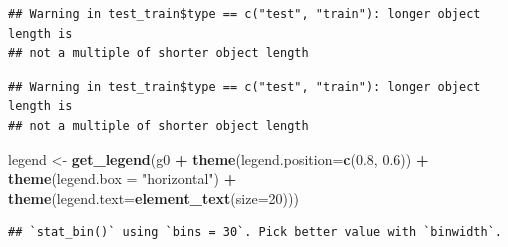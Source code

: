 \documentclass[]{article}
\newenvironment{Shaded}{\begin{snugshade}}{\end{snugshade}}
\newcommand{\KeywordTok}[1]{\textcolor[rgb]{0.13,0.29,0.53}{\textbf{#1}}}
\newcommand{\DataTypeTok}[1]{\textcolor[rgb]{0.13,0.29,0.53}{#1}}
\newcommand{\DecValTok}[1]{\textcolor[rgb]{0.00,0.00,0.81}{#1}}
\newcommand{\FloatTok}[1]{\textcolor[rgb]{0.00,0.00,0.81}{#1}}
\newcommand{\StringTok}[1]{\textcolor[rgb]{0.31,0.60,0.02}{#1}}
\newcommand{\CommentTok}[1]{\textcolor[rgb]{0.56,0.35,0.01}{\textit{#1}}}
\newcommand{\OperatorTok}[1]{\textcolor[rgb]{0.81,0.36,0.00}{\textbf{#1}}}
\newcommand{\NormalTok}[1]{#1}
\begin{document}
\begin{verbatim}
## Warning in test_train$type == c("test", "train"): longer object length is
## not a multiple of shorter object length
\end{verbatim}

\begin{Shaded}
\end{Shaded}

\begin{verbatim}
## Warning in test_train$type == c("test", "train"): longer object length is
## not a multiple of shorter object length
\end{verbatim}

\begin{Shaded}
\begin{Highlighting}[]
\NormalTok{legend <-}\StringTok{ }\KeywordTok{get_legend}\NormalTok{(g0 }\OperatorTok{+}\StringTok{ }\KeywordTok{theme}\NormalTok{(}\DataTypeTok{legend.position=}\KeywordTok{c}\NormalTok{(}\FloatTok{0.8}\NormalTok{, }\FloatTok{0.6}\NormalTok{)) }\OperatorTok{+}\StringTok{ }\KeywordTok{theme}\NormalTok{(}\DataTypeTok{legend.box =} \StringTok{"horizontal"}\NormalTok{) }\OperatorTok{+}\StringTok{ }\KeywordTok{theme}\NormalTok{(}\DataTypeTok{legend.text=}\KeywordTok{element_text}\NormalTok{(}\DataTypeTok{size=}\DecValTok{20}\NormalTok{)))}
\end{Highlighting}
\end{Shaded}

\begin{verbatim}
## `stat_bin()` using `bins = 30`. Pick better value with `binwidth`.
\end{verbatim}
\end{document}
